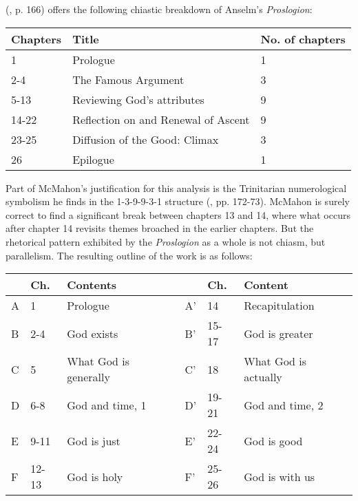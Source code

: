\documentclass[]{birkjour}
\begin{document}
(\cite{McMahon2004}, p. 166) offers the following chiastic breakdown of Anselm's \textit{Proslogion}:

\bigskip

\begin{tabular}{l|l|l}
Chapters & Title & No. of chapters\\ \hline
1 & Prologue & 1\\ 
2-4 & The Famous Argument & 3\\ 
5-13 & Reviewing God's attributes & 9\\ 
14-22 & Reflection on and Renewal of Ascent & 9\\ 
23-25 & Diffusion of the Good: Climax & 3\\ 
26 & Epilogue & 1\\
\end{tabular}

\bigskip

Part of McMahon's justification for this analysis is the Trinitarian numerological symbolism he finds in the 1-3-9-9-3-1 structure (\cite{McMahon2004}, pp. 172-73).  McMahon is surely correct to find a significant break between chapters 13 and 14, where what occurs after chapter 14 revisits themes broached in the earlier chapters. But the rhetorical pattern exhibited by the \textit{Proslogion} as a whole is not chiasm, but parallelism. The resulting outline of the work is as follows:

\bigskip

\begin{tabular}{l|l|l|l|l|l}
& Ch. & Contents & & Ch. & Content \\ \hline
A & 1 & Prologue & A' & 14 & Recapitulation \\
B & 2-4 & God exists & B' & 15-17 & God is greater \\
C & 5 & What God is generally & C' & 18 & What God is actually\\
D & 6-8 & God and time, 1 & D' & 19-21 & God and time, 2 \\
E & 9-11 & God is just & E' & 22-24 & God is good \\
F & 12-13 & God is holy & F' & 25-26 & God is with us \\
\end{tabular}

\bigskip
\end{document}
